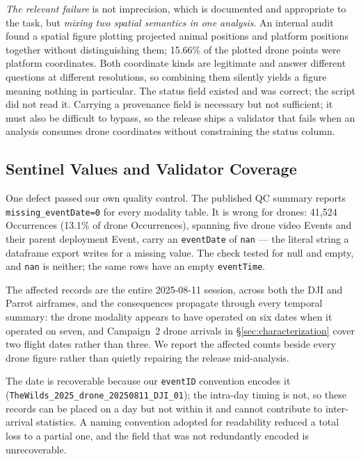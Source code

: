 \documentclass[sigconf]{acmart}
\begin{document}
\emph{The relevant failure} is not imprecision, which is documented and
appropriate to the task, but \emph{mixing two spatial semantics in one
analysis}. An internal audit found a spatial figure plotting projected
animal positions and platform positions together without distinguishing
them; 15.66\% of the plotted drone points were platform coordinates.
Both coordinate kinds are legitimate and answer different questions at
different resolutions, so combining them silently yields a figure
meaning nothing in particular. The status field existed and was correct;
the script did not read it. Carrying a provenance field is necessary but
not sufficient; it must also be difficult to bypass, so the release
ships a validator that fails when an analysis consumes drone coordinates
without constraining the status column.

\subsection{Sentinel Values and Validator Coverage}
\label{sec:nulldefect}

One defect passed our own quality control. The published QC summary
reports
\texttt{missing\_\allowbreak eventDate=0} for every modality table. It is wrong for
drones: 41{,}524 Occurrences (13.1\% of drone Occurrences), spanning
five drone video Events and their parent deployment Event, carry an
\texttt{eventDate} of \texttt{nan} --- the literal string a dataframe
export writes for a missing value. The check tested for null and empty,
and \texttt{nan} is neither; the same rows have an empty
\texttt{eventTime}.

The affected records are the entire 2025-08-11 session, across both the
DJI and Parrot airframes, and the consequences propagate through every
temporal summary: the drone modality appears to have operated on six
dates when it operated on seven, and Campaign~2 drone arrivals in
\S\ref{sec:characterization} cover two flight dates rather than three.
We report the affected counts beside every drone figure rather than
quietly repairing the release mid-analysis.

The date is recoverable because our \texttt{eventID} convention encodes
it (\texttt{TheWilds\_2025\_drone\_20250811\_DJI\_01}); the intra-day
timing is not, so these records can be placed on a day but not within it
and cannot contribute to inter-arrival statistics. A naming convention
adopted for readability reduced a total loss to a partial one, and the
field that was not redundantly encoded is unrecoverable.
\end{document}
